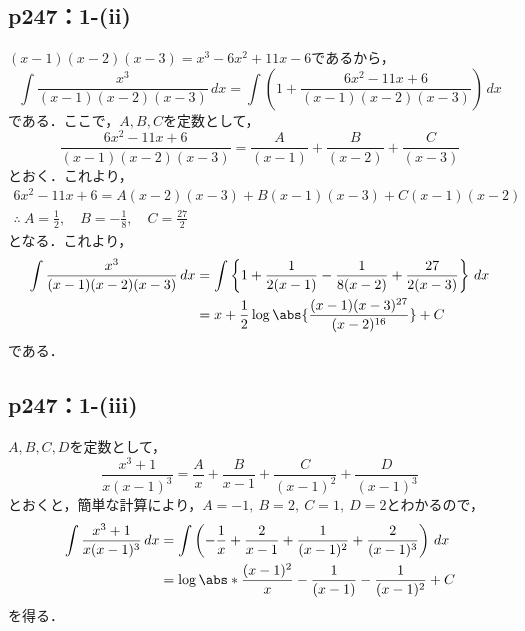 \documentclass[a4paper,10pt,fleqn]{ltjsarticle}
\begin{document}
\subsection*{p247：1-(ii)}

\begin{tleftbar}
    $(x-1)(x-2)(x-3)=x^3 -6x^2+11x-6$であるから，
    \[
        \int \frac{x^3}{(x-1)(x-2)(x-3)} \, dx  = \int \left (1+ \frac{6x^2-11x+6}{(x-1)(x-2)(x-3)}\right) \, dx
    \]
    である．ここで，$A,B,C$を定数として，
    \[
        \frac{6x^2-11x+6}{(x-1)(x-2)(x-3)} = \frac{A}{(x-1)}+\frac{B}{(x-2)}+\frac{C}{(x-3)}
    \]
    とおく．これより，
    \begin{gather*}
        6x^2-11x+6 = A(x-2)(x-3)+B (x-1)(x-3)+C(x-1)(x-2) \\
        \therefore ~ A = \frac{1}{2}, \quad B = -\frac{1}{8},\quad C= \frac{27}{2}
    \end{gather*}
    となる．これより，
    \begin{align*}
        \int \frac{x^3}{(x-1)(x-2)(x-3)} \, dx & = \int \left \{ 1+ \frac{1}{2(x-1)} - \frac{1}{8(x-2)}+\frac{27}{2(x-3)} \right \} \, dx \\
                                               & = x + \frac{1}{2} \log \abs{\frac{(x-1)(x-3)^{27}}{(x-2)^{16}}}+C
    \end{align*}
    である．
\end{tleftbar}

\subsection*{p247：1-(iii)}

\begin{tleftbar}
    $A,B,C,D$を定数として，
    \[
        \frac{x^3+1}{x(x-1)^3} = \frac{A}{x}+\frac{B}{x-1}+\frac{C}{(x-1)^2}+\frac{D}{(x-1)^3}
    \]
    とおくと，簡単な計算により，$A=-1,~B=2,~C=1,~D=2$とわかるので，
    \begin{align*}
        \int \frac{x^3+1}{x(x-1)^3} \, dx & = \int \left (-\frac{1}{x}+\frac{2}{x-1}+\frac{1}{(x-1)^2}+\frac{2}{(x-1)^3} \right ) \, dx \\
                                          & = \log \abs*{\frac{(x-1)^2}{x}} -\frac{1}{(x-1)}-\frac{1}{(x-1)^2}+ C
    \end{align*}
    を得る．
\end{tleftbar}
\end{document}
